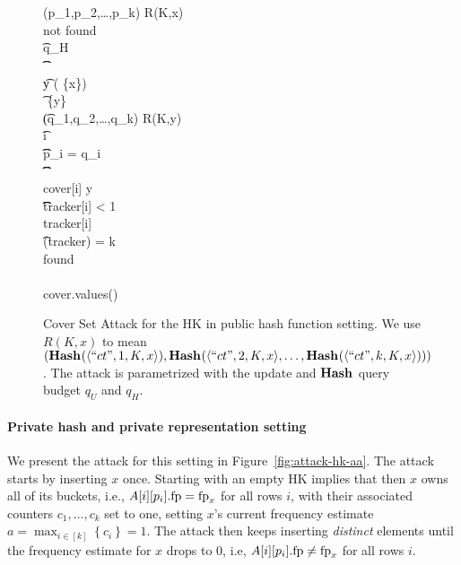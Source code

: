 \begin{figure*}[ht!]
\begin{pchstack}[boxed,center,space=0.5em]
\begin{pcvstack}[space=0.45em]
{			\\
			\\
			(p_1,p_2,\ldots,p_k) \gets R(K,x)\\
			\pcwhile \textrm{not found}\\
			\t \pcif q_H \ \HASHO{}\\
			\t \t \pcreturn \emptyset\\
			\t y \getsr {}\setminus ( \cup \{x\})\\
			\t \set{I} \gets {} \cup \{y\}\\
			\t (q_1,q_2,\ldots,q_k) \gets R(K,y)\\
			\t \pcfor i \in [k]\\
			\t \t \pcif p_i = q_i\\
			\t \t \t {}\\
			\t \t \t \textrm{cover}[i] \gets y\\
			\t \t \t \pcif \textrm{tracker}[i] < 1\\
			\t \t \t \t  \textrm{tracker}[i] \\
			\t \pcif {}(\textrm{tracker}) = k\\
			\t \t \textrm{found} \gets {}\\
			\\
			\pcreturn \textrm{cover.values()}
		}
	\end{pcvstack}
	\end{pchstack}
	\caption{Cover Set Attack for the HK in public
		hash function setting. 
		We use $R(K,x)$ to mean $(\textup{\textbf{Hash}}\hspace{0.5pt}(\langle ``ct", 1,K,x \rangle),\textup{\textbf{Hash}}\hspace{0.5pt}(\langle ``ct", 2,K,x \rangle,\ldots,\textup{\textbf{Hash}}\hspace{0.5pt}(\langle ``ct", k,K,x \rangle)))$.
		The attack is parametrized with the update and $\textup{\textbf{Hash}}\hspace{0.5pt}$ query budget $q_U$ and $q_H$.
	}
	\label{fig:attack-hk-hfis}
\end{figure*}

\paragraph{Private hash and private representation setting}
We present the attack for this setting in Figure~\ref{fig:attack-hk-aa}.
The attack starts by inserting $x$ once. Starting with an empty HK implies that then $x$ owns all of its buckets, i.e., $A[i][p_i].\textup{fp} = \textup{fp}_x$ for all rows $i$, with their associated counters $c_1, \dots, c_k$ set to one, setting $x$'s current frequency estimate 
$a = \max_{{i \in [k]}} \left\{c_i\right\} = 1$. The attack then keeps inserting \textit{distinct} elements until the frequency estimate for $x$ drops to $0$, i.e, $A[i][p_i].\textup{fp} \not= \textup{fp}_x$ for all rows $i$.

